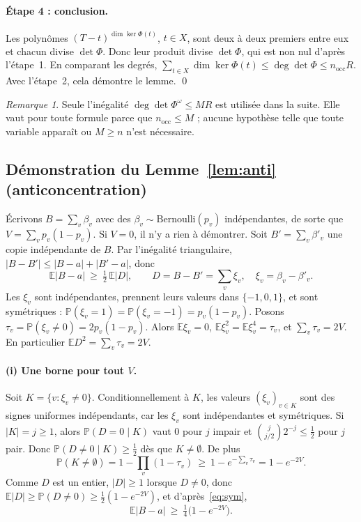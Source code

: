 \documentclass[11pt,a4paper]{article}
\theoremstyle{definition}
\theoremstyle{remark}
\newtheorem{remark}[theorem]{Remarque}
\newcommand{\E}{\mathbb{E}}
\newcommand{\PP}{\mathbb{P}}
\newcommand{\nocc}{n_{\mathrm{occ}}}
\begin{document}
\paragraph{Étape 4 : conclusion.} Les polynômes $(T-t)^{\dim\ker\Phi(t)}$, $t\in X$, sont
deux à deux premiers entre eux et chacun divise $\det\Phi$. Donc leur produit divise
$\det\Phi$, qui est non nul d'après l'étape~1. En comparant les degrés,
$\sum_{t\in X}\dim\ker\Phi(t)\le\deg\det\Phi\le\nocc R$. Avec l'étape~2, cela démontre le
lemme. \qed

\begin{remark}\label{rem:mn}
Seule l'inégalité $\deg\det\Phi^\omega\le MR$ est utilisée dans la suite. Elle vaut pour
toute formule parce que $\nocc\le M$ ; aucune hypothèse telle que \og toute variable
apparaît\fg{} ou $M\ge n$ n'est nécessaire.
\end{remark}

\subsection{Démonstration du Lemme~\ref{lem:anti} (anticoncentration)}

Écrivons $B=\sum_{v}\beta_v$ avec des $\beta_v\sim\mathrm{Bernoulli}(p_v)$ indépendantes,
de sorte que $V=\sum_vp_v(1-p_v)$. Si $V=0$, il n'y a rien à démontrer. Soit
$B'=\sum_v\beta'_v$ une copie indépendante de $B$. Par l'inégalité triangulaire,
$|B-B'|\le|B-a|+|B'-a|$, donc
\begin{equation}\label{eq:sym}
\E|B-a|\ \ge\ \tfrac12\,\E|D|,\qquad D=B-B'=\sum_v\xi_v,\quad \xi_v=\beta_v-\beta'_v .
\end{equation}
Les $\xi_v$ sont indépendantes, prennent leurs valeurs dans $\{-1,0,1\}$, et sont
symétriques : $\PP(\xi_v=1)=\PP(\xi_v=-1)=p_v(1-p_v)$. Posons
$\tau_v=\PP(\xi_v\ne0)=2p_v(1-p_v)$. Alors $\E\xi_v=0$, $\E\xi_v^2=\E\xi_v^4=\tau_v$, et
$\sum_v\tau_v=2V$. En particulier $\E D^2=\sum_v\tau_v=2V$.

\paragraph{(i) Une borne pour tout $V$.} Soit $K=\{v:\xi_v\ne0\}$. Conditionnellement à
$K$, les valeurs $(\xi_v)_{v\in K}$ sont des signes uniformes indépendants, car les $\xi_v$
sont indépendantes et symétriques. Si $|K|=j\ge1$, alors $\PP(D=0\mid K)$ vaut $0$ pour $j$
impair et $\binom{j}{j/2}2^{-j}\le\frac12$ pour $j$ pair. Donc
$\PP(D\ne0\mid K)\ge\frac12$ dès que $K\ne\emptyset$. De plus
\[
\PP(K\ne\emptyset)=1-\prod_v(1-\tau_v)\ \ge\ 1-e^{-\sum_v\tau_v}=1-e^{-2V}.
\]
Comme $D$ est un entier, $|D|\ge1$ lorsque $D\ne0$, donc
$\E|D|\ge\PP(D\ne0)\ge\frac12(1-e^{-2V})$, et d'après~\eqref{eq:sym},
\begin{equation}\label{eq:smallV}
\E|B-a|\ \ge\ \tfrac14\bigl(1-e^{-2V}\bigr).
\end{equation}
\end{document}
